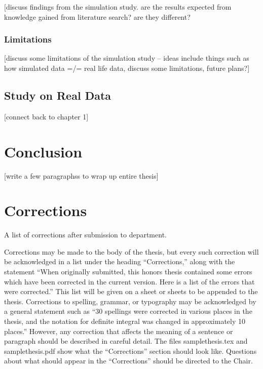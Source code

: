 \documentclass[12pt, twoside]{amherstthesis}
\begin{document}
{[}discuss findings from the simulation study. are the results expected from knowledge gained from literature search? are they different?

\hypertarget{limitations}{%
\subsection{Limitations}\label{limitations}}

{[}discuss some limitations of the simulation study -- ideas include things such as how simulated data =/= real life data, discuss some limitations, future plans?{]}

\hypertarget{real_data}{%
\section{Study on Real Data}\label{real_data}}

{[}connect back to chapter 1{]}

\hypertarget{conclusion}{%
\chapter{Conclusion}\label{conclusion}}

{[}write a few paragraphss to wrap up entire thesis{]}

\hypertarget{corrections}{%
\chapter*{Corrections}\label{corrections}}

A list of corrections after submission to department.

Corrections may be made to the body of the thesis, but every such correction will be acknowledged in a list under the heading ``Corrections,'' along with the statement ``When originally submitted, this honors thesis contained some errors which have been corrected in the current version. Here is a list of the errors that were corrected.'' This list will be given on a sheet or sheets to be appended to the thesis. Corrections to spelling, grammar, or typography may be acknowledged by a general statement such as ``30 spellings were corrected in various places in the thesis, and the notation for definite integral was changed in approximately 10 places.'' However, any correction that affects the meaning of a sentence or paragraph should be described in careful detail. The files samplethesis.tex and samplethesis.pdf show what the ``Corrections'' section should look like. Questions about what should appear in the ``Corrections'' should be directed to the Chair.
\end{document}
